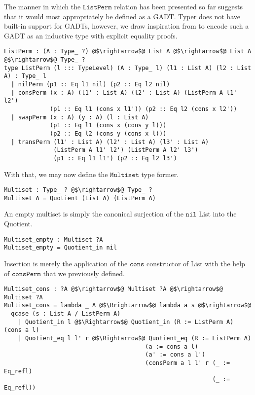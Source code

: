 \documentclass[12pt,twoside,maitrise]{dms}
\theoremstyle{definition}
\numberwithin{equation}{section}
\numberwithin{table}{chapter}
\numberwithin{figure}{chapter}
\newcommand\fn[1] {\texttt{#1}}
\begin{document}
The manner in which the $\fn{ListPerm}$ relation has been presented so far suggests
that it would most appropriately be defined as a GADT. Typer does not have built-in
support for GADTs, however, we draw inspiration from\cite{sulzmann2007systemfeq} to
encode such a GADT as an inductive type with explicit equality proofs.

\begin{verbatim}
ListPerm : (A : Type_ ?) @$\rightarrow$@ List A @$\rightarrow$@ List A @$\rightarrow$@ Type_ ?
type ListPerm (l ::: TypeLevel) (A : Type_ l) (l1 : List A) (l2 : List A) : Type_ l
  | nilPerm (p1 :: Eq l1 nil) (p2 :: Eq l2 nil)
  | consPerm (x : A) (l1' : List A) (l2' : List A) (ListPerm A l1' l2')
             (p1 :: Eq l1 (cons x l1')) (p2 :: Eq l2 (cons x l2'))
  | swapPerm (x : A) (y : A) (l : List A)
             (p1 :: Eq l1 (cons x (cons y l)))
             (p2 :: Eq l2 (cons y (cons x l)))
  | transPerm (l1' : List A) (l2' : List A) (l3' : List A)
              (ListPerm A l1' l2') (ListPerm A l2' l3')
              (p1 :: Eq l1 l1') (p2 :: Eq l2 l3')
\end{verbatim}

With that, we may now define the $\fn{Multiset}$ type former.

\begin{verbatim}
Multiset : Type_ ? @$\rightarrow$@ Type_ ?
Multiset A = Quotient (List A) (ListPerm A)
\end{verbatim}

An empty multiset is simply the canonical surjection of the $\fn{nil}$ List into
the Quotient.

\begin{verbatim}
Multiset_empty : Multiset ?A
Multiset_empty = Quotient_in nil
\end{verbatim}

Insertion is merely the application of the $\fn{cons}$ constructor of List with the help
of $\fn{consPerm}$ that we previously defined.

\begin{verbatim}
Multiset_cons : ?A @$\rightarrow$@ Multiset ?A @$\rightarrow$@ Multiset ?A
Multiset_cons = lambda _ A @$\Rrightarrow$@ lambda a s @$\rightarrow$@
  qcase (s : List A / ListPerm A)
    | Quotient_in l @$\Rightarrow$@ Quotient_in (R := ListPerm A) (cons a l)
    | Quotient_eq l l' r @$\Rightarrow$@ Quotient_eq (R := ListPerm A)
                                        (a := cons a l)
                                        (a' := cons a l')
                                        (consPerm a l l' r (_ := Eq_refl)
                                                           (_ := Eq_refl))
\end{verbatim}
\end{document}
